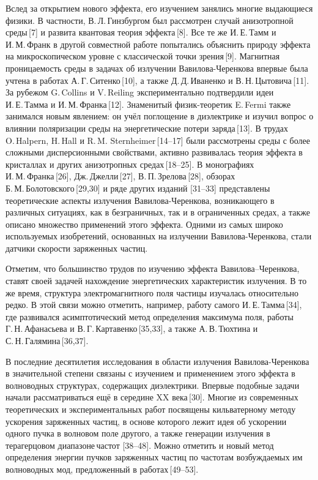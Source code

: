 Вслед за открытием нового эффекта, его изучением занялись многие выдающиеся физики. В частности, В. Л. Гинзбургом был рассмотрен случай анизотропной среды [7] и развита квантовая теория эффекта [8]. Все те же И. Е. Тамм и И. М. Франк в другой совместной работе попытались объяснить природу эффекта на микроскопическом уровне с классической точки зрения [9]. Магнитная проницаемость среды в задачах об излучении Вавилова-Черенкова впервые была учтена в работах А. Г. Ситенко [10], а также Д. Д. Иваненко и В. Н. Цытовича [11]. За рубежом G. Collins и V. Reiling экспериментально подтвердили идеи И. Е. Тамма и И. М. Франка [12]. Знаменитый физик-теоретик E. Fermi также занимался новым явлением: он учёл поглощение в диэлектрике и изучил вопрос о влиянии поляризации среды на энергетические потери заряда [13]. В трудах O. Halpern, H. Hall и R. M. Sternheimer [14–17] были рассмотрены среды с более сложными дисперсионными свойствами, активно развивалась теория эффекта в кристаллах и других анизотропных средах [18–25]. В монографиях И. М. Франка [26], Дж. Джелли [27], В. П. Зрелова [28], обзорах Б. М. Болотовского [29,30] и ряде других изданий [31–33] представлены теоретические аспекты излучения Вавилова-Черенкова, возникающего в различных ситуациях, как в безграничных, так и в ограниченных средах, а также описано множество применений этого эффекта. Одними из самых широко используемых изобретений, основанных на излучении Вавилова-Черенкова, стали датчики скорости заряженных частиц.  

Отметим, что большинство трудов по изучению эффекта Вавилова–Черенкова, ставят своей задачей нахождение энергетических характеристик излучения. В то же время, структура электромагнитного поля частицы изучалась относительно редко. В этой связи можно отметить, например, работу самого И. Е. Тамма [34], где развивался асимптотический метод определения максимума поля, работы Г. Н. Афанасьева и В. Г. Картавенко [35,33], а также А. В. Тюхтина и С. Н. Галямина [36,37].  

В последние десятилетия исследования в области излучения Вавилова-Черенкова в значительной степени связаны с изучением и применением этого эффекта в волноводных структурах, содержащих диэлектрики. Впервые подобные задачи начали рассматриваться ещё в середине XX века [30]. Многие из современных теоретических и экспериментальных работ посвящены кильватерному методу ускорения заряженных частиц, в основе которого лежит идея об ускорении одного пучка в волновом поле другого, а также генерации излучения в терагерцовом диапазоне частот [38–48]. Можно отметить и новый метод определения энергии пучков заряженных частиц по частотам возбуждаемых им волноводных мод, предложенный в работах [49–53].  

